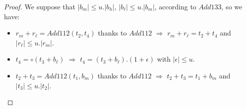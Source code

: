 \begin{proof} \color{-yellow}
We suppose that $\lvert b_m \rvert \le u. \lvert b_h \rvert$, $\lvert b_{\ell} \rvert \le u. \lvert b_m \rvert$, according to  $Add133$,  so we have:
\begin{itemize}
\item $r_m+r_{\ell} = Add112(t_2, t_4)$ thanks to $Add112$ $\Rightarrow$ $r_m+r_{\ell} = t_2+ t_4$ and $ \lvert r_{\ell} \rvert \le u. \lvert r_m \rvert$. 

\item $t_4 = \circ(t_3 + b_{\ell})$ $\Rightarrow$ $t_4 = (t_3 + b_{\ell}).(1+\epsilon)$ with $\lvert \epsilon \rvert \le u$.

\item $t_2+ t_3 = Add112(t_1, b_m)$ thanks to $Add112$ $\Rightarrow$ $t_2+ t_3 = t_1+ b_m$ and $ \lvert t_3 \rvert \le u. \lvert t_2 \rvert$.


\end{itemize}
\end{proof}
